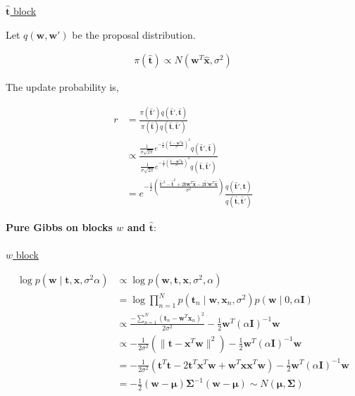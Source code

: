 \documentclass[10pt]{homeworg}
\begin{document}
\underline{$\hat{\boldsymbol t}$ block}

Let $q(\boldsymbol w, \boldsymbol w')$ be the proposal distribution.

\begin{align*}
\pi(\hat{\boldsymbol t}) \propto N(\boldsymbol w^T\hat{\boldsymbol x}, \sigma^2)
\end{align*}

The update probability is,

\begin{align*}
r &= \frac{\pi(\hat{\boldsymbol t}')q(\hat{\boldsymbol t}',\hat{\boldsymbol t})}{\pi(\hat{\boldsymbol t})q(\hat{\boldsymbol t}, \hat{\boldsymbol t}')}\\
  &\propto \frac{\frac{1}{\sigma\sqrt{2\pi}}e^{-\frac{1}{2}(\frac{\hat{\boldsymbol t}'-\boldsymbol w^T\hat{\boldsymbol x}}{\sigma})^2}q(\hat{\boldsymbol t}', \hat{\boldsymbol t})}{\frac{1}{\sigma\sqrt{2\pi}}e^{-\frac{1}{2}(\frac{\hat{\boldsymbol t}-\boldsymbol w^T\hat{\boldsymbol x}}{\sigma})^2}q(\hat{\boldsymbol t}, \hat{\boldsymbol t}')}\\
  &= e^{-\frac{1}{2}(\frac{\hat{\boldsymbol t}'^2-\hat{\boldsymbol t}^2+2\hat{\boldsymbol t}\boldsymbol w^T\hat{\boldsymbol x}-2\hat{\boldsymbol t}'\boldsymbol w^T\hat{\boldsymbol x}}{\sigma^2})}\frac{q(\hat{\boldsymbol t}', \hat{\boldsymbol t})}{q(\hat{\boldsymbol t}, \hat{\boldsymbol t}')}
\end{align*}

\newpage

\textbf{Pure Gibbs on blocks $w$ and $\hat{\boldsymbol t}$}:\\
\\
\underline{$w$ block}

\begin{align*}
\log{p(\boldsymbol w \mid \boldsymbol t,\boldsymbol x,\sigma^2\alpha)} &\propto \log{p(\boldsymbol w,\boldsymbol t,\boldsymbol x,\sigma^2,\alpha)}\\
&= \log{\prod_{n=1}^N p(\boldsymbol t_n \mid \boldsymbol w,\boldsymbol x_n,\sigma^2)p(\boldsymbol w \mid 0, \alpha \boldsymbol I)}\\
&\propto \frac{-\sum_{n=1}^N (\boldsymbol t_n-\boldsymbol w^T\boldsymbol x_n)^2}{2\sigma^2} - \frac{1}{2}\boldsymbol w^T(\alpha \boldsymbol I)^{-1}\boldsymbol w\\
&\propto -\frac{1}{2\sigma^2}(\|\boldsymbol t-\boldsymbol x^T\boldsymbol w \|^2)-\frac{1}{2}\boldsymbol w^T(\alpha \boldsymbol I)^{-1}\boldsymbol w\\
&= -\frac{1}{2\sigma^2}(\boldsymbol t^T\boldsymbol t-2\boldsymbol t^T\boldsymbol x^T\boldsymbol w+\boldsymbol w^T\boldsymbol x\boldsymbol x^T\boldsymbol w)-\frac{1}{2}\boldsymbol w^T(\alpha \boldsymbol I)^{-1}\boldsymbol w\\
&= -\frac{1}{2}(\boldsymbol w-\boldsymbol \mu)\boldsymbol \Sigma^{-1}(\boldsymbol w-\boldsymbol \mu) \sim N(\boldsymbol \mu,\boldsymbol \Sigma)
\end{align*}
\end{document}
